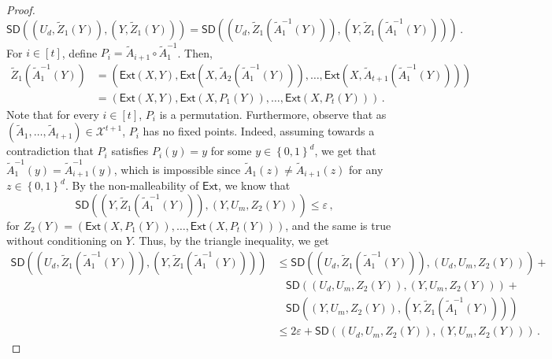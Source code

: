 \documentclass[11pt]{article}
\numberwithin{equation}{section}
\theoremstyle{definition}
\theoremstyle{plain}
\newcommand{\ext}{\mathsf{Ext}}
\newcommand{\eps}{\varepsilon}
\newcommand{\nc}{\mathcal{X}}
\newcommand{\set}[1]{\left\{{#1}\right\}}
\newcommand{\B}{\set{0,1}}
\def\SD{\ensuremath{\mathsf{SD}}}
\begin{document}
\begin{proof}
\begin{equation}
\SD((U_d,\widetilde{Z}_1(Y)),(Y,\widetilde{Z}_1(Y))) = 
\SD((U_d,\widetilde{Z}_1(\widetilde{A}_{1}^{-1}(Y))),(Y,\widetilde{Z}_1(\widetilde{A}_{1}^{-1}(Y))))\,.
\end{equation}
For $i \in [t]$, define $P_i = \widetilde{A}_{i+1} \circ \widetilde{A}_{1}^{-1}$. Then,
\begin{align*}
\widetilde{Z}_1(\widetilde{A}_{1}^{-1}(Y)) &= \left( \ext(X,Y), \ext\left(X,\widetilde{A}_{2}(\widetilde{A}_{1}^{-1}(Y))\right), \ldots,\ext\left(X,\widetilde{A}_{t+1}(\widetilde{A}_{1}^{-1}(Y))\right)\right) \\ &=
\left( \ext\left( X,Y \right),\ext\left( X,P_{1}(Y) \right),\ldots,\ext\left( X,P_{t}(Y) \right) \right)\,.
\end{align*}
Note that for every $i \in [t]$, $P_i$ is a permutation. Furthermore, observe that as $(\widetilde{A}_1,\ldots,\widetilde{A}_{t+1}) \in \nc^{t+1}$,  $P_i$ has no fixed points. Indeed, assuming
towards a contradiction that $P_i$ satisfies $P_i(y)=y$ for some $y \in \B^{d}$, we get
that $\widetilde{A}_{1}^{-1}(y) = \widetilde{A}^{-1}_{i+1}(y)$, which is impossible since
$\widetilde{A}_{1}(z) \neq \widetilde{A}_{i+1}(z)$ for any $z \in \B^{d}$.
By the non-malleability of $\ext$, we know that
\[
\SD((Y,\widetilde{Z}_1(\widetilde{A}_1^{-1}(Y))),(Y,U_m,Z_{2}(Y))) \le \eps\,,
\]
for $Z_{2}(Y) = (\ext(X,P_{1}(Y)),\ldots,\ext(X,P_{t}(Y)))$, and the same is true without conditioning on $Y$.
Thus, by the triangle inequality, we get
\begin{align}\label{eq:sec44}
\SD((U_d,\widetilde{Z}_1(\widetilde{A}_{1}^{-1}(Y))),(Y,\widetilde{Z}_1(\widetilde{A}_{1}^{-1}(Y)))) &\le 
\SD((U_d,\widetilde{Z}_1(\widetilde{A}_{1}^{-1}(Y))),(U_d,U_m,Z_{2}(Y))) + \nonumber \\
& ~~~~\SD((U_d,U_m,Z_{2}(Y)),(Y,U_m,Z_{2}(Y))) + \nonumber \\
& ~~~~\SD((Y,U_m,Z_{2}(Y)),(Y,\widetilde{Z}_1(\widetilde{A}_{1}^{-1}(Y)))) \nonumber \\
&\le 2\eps + \SD((U_d,U_m,Z_{2}(Y)),(Y,U_m,Z_{2}(Y)))\,.
\end{align}


\end{proof}
\end{document}
